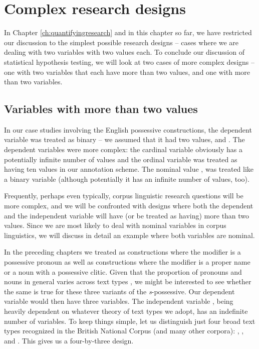 \section{Complex research designs}
\label{sec:complexdesigns}

In Chapter \ref{ch:quantifyingresearch} and in this chapter so far, we have restricted our discussion to the simplest possible research designs -- cases where we are dealing with two variables with two values each. To conclude our discussion of statistical hypothesis testing, we will look at two cases of more complex designs -- one with two variables that each have more than two values, and one with more than two variables.

\subsection{Variables with more than two values}
\label{sec:morethantwovalues}

In our case studies involving the English possessive constructions, the dependent variable  was treated as binary -- we assumed that it had two values,  and . The dependent variables were more complex: the cardinal variable  obviously has a potentially infinite number of values and the ordinal variable  was treated as having ten values in our annotation scheme. The nominal value , was treated like a binary variable (although potentially it has an infinite number of values, too).

Frequently, perhaps even typically, corpus linguistic research questions will be more complex, and we will be confronted with designs where both the dependent and the independent variable will have (or be treated as having) more than two values. Since we are most likely to deal with nominal variables in corpus linguistics, we will discuss in detail an example where both variables are nominal.

In the preceding chapters we treated as  constructions where the modifier is a possessive pronoun as well as constructions where the modifier is a proper name or a noun with a possessive clitic. Given that the proportion of pronouns and nouns in general varies across text types \citep{biber_longman_1999}, we might be interested to see whether the same is true for these three variants of the \textit{s}-possessive. Our dependent variable  would then have three variables. The independent variable , being heavily dependent on whatever theory of text types we adopt, has an indefinite number of variables. To keep things simple, let us distinguish just four broad text types recognized in the British National Corpus (and many other corpora): , ,  and . This gives us a four-by-three design.

